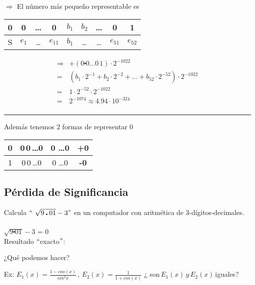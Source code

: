 \begin{center}
$\Rightarrow$ El número más pequeño representable es\\
\vspace{3mm}
\begin{tabular}{c|c c c| c c c c c}
0 & 0 & \ldots & 0 & $b_{1}$ & $b_{2}$ & \ldots & 0 & 1\\
\hline
S & $e_{1}$ & \ldots & $e_{11}$ & $b_{1}$ & \ldots & \ldots & $e_{51}$ & $e_{52}$\\
\end{tabular} 
\end{center}
$$
\begin{array}{cl}
\Rightarrow & +(0\centerdot 0 \dots 0\,1) \cdot 2^{-1022}\\ 
= & (b_{1}\cdot2^{-1} + b_{2}\cdot2^{-2} + \ldots + b_{52}\cdot2^{-52})\cdot 2^{-1022}\\ 
= & 1\cdot2^{-52} \cdot 2^{-1022}\\
= & 2^{-1074} \approx 4.94 \cdot 10^{-324}\\
\end{array} 
$$

\vspace{3mm}
\begin{center}
\rule{15cm}{0.1mm}
\end{center}
\vspace{3mm}

Además tenemos 2 formas de representar 0
\begin{center}
\begin{tabular}{|c|c|c|c|}
\hline 
0 & 0\,0\,\ldots 0 & 0 \ldots 0 & \textbf{+0}\\ 
\hline 
1 & 0\,0\,\ldots 0 & 0 \ldots 0 & \textbf{-0}\\ 
\hline 
\end{tabular} 
\end{center}

\newpage

\subsection{Pérdida de Significancia}
\begin{center}

Calcula $``$ $\sqrt{9\centerdot01} -3"$ en un computador con aritmética de 3-dígitos-decimales.\\
\vspace{3mm}
\\
\vspace{3mm}
$\sqrt{9\centerdot01} -3$ = 0\\
\vspace{3mm}
Resultado $``$exacto$"$: \\
\vspace{3mm}
\begin{Large}
¿Qué podemos hacer?\\
\end{Large}
\end{center}
\newpage
Ex: $\displaystyle{E_{1}(x)= \frac{1-cos(x)}{sin^{2}x}\,,\,E_{2}(x) = \frac{1}{1+cos(x)}\,\, }$¿ son\,$E_{1}(x)\,y\,E_{2}(x)\,$iguales?

